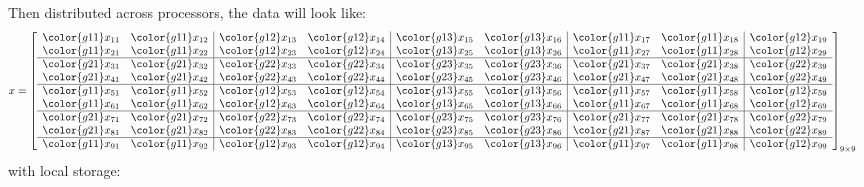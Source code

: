 Then distributed across processors, the data will look like:
\begin{align*}
x &= \left[
      \begin{array}{ll|ll|ll|ll|l}
      \color{g11}x_{11} & \color{g11}x_{12} & \color{g12}x_{13} & \color{g12}x_{14} & \color{g13}x_{15} & \color{g13}x_{16} & \color{g11}x_{17} & \color{g11}x_{18} & \color{g12}x_{19}\\
      \color{g11}x_{21} & \color{g11}x_{22} & \color{g12}x_{23} & \color{g12}x_{24} & \color{g13}x_{25} & \color{g13}x_{26} & \color{g11}x_{27} & \color{g11}x_{28} & \color{g12}x_{29}\\\hline
      \color{g21}x_{31} & \color{g21}x_{32} & \color{g22}x_{33} & \color{g22}x_{34} & \color{g23}x_{35} & \color{g23}x_{36} & \color{g21}x_{37} & \color{g21}x_{38} & \color{g22}x_{39}\\
      \color{g21}x_{41} & \color{g21}x_{42} & \color{g22}x_{43} & \color{g22}x_{44} & \color{g23}x_{45} & \color{g23}x_{46} & \color{g21}x_{47} & \color{g21}x_{48} & \color{g22}x_{49}\\\hline
      \color{g11}x_{51} & \color{g11}x_{52} & \color{g12}x_{53} & \color{g12}x_{54} & \color{g13}x_{55} & \color{g13}x_{56} & \color{g11}x_{57} & \color{g11}x_{58} & \color{g12}x_{59}\\
      \color{g11}x_{61} & \color{g11}x_{62} & \color{g12}x_{63} & \color{g12}x_{64} & \color{g13}x_{65} & \color{g13}x_{66} & \color{g11}x_{67} & \color{g11}x_{68} & \color{g12}x_{69}\\\hline
      \color{g21}x_{71} & \color{g21}x_{72} & \color{g22}x_{73} & \color{g22}x_{74} & \color{g23}x_{75} & \color{g23}x_{76} & \color{g21}x_{77} & \color{g21}x_{78} & \color{g22}x_{79}\\
      \color{g21}x_{81} & \color{g21}x_{82} & \color{g22}x_{83} & \color{g22}x_{84} & \color{g23}x_{85} & \color{g23}x_{86} & \color{g21}x_{87} & \color{g21}x_{88} & \color{g22}x_{89}\\\hline
      \color{g11}x_{91} & \color{g11}x_{92} & \color{g12}x_{93} & \color{g12}x_{94} & \color{g13}x_{95} & \color{g13}x_{96} & \color{g11}x_{97} & \color{g11}x_{98} & \color{g12}x_{99}\\
      \end{array}
\right]_{9\times 9}
\end{align*}
 with local storage:
